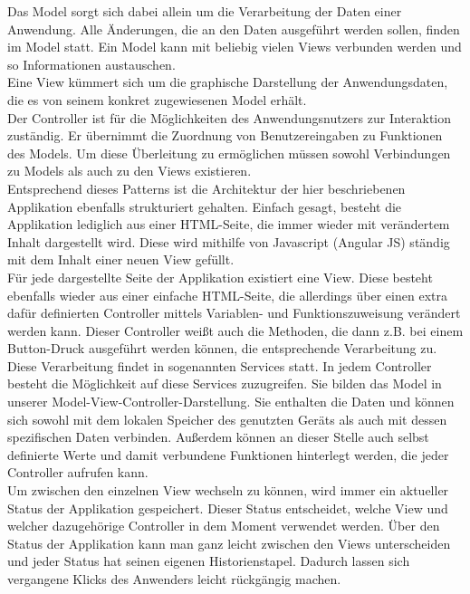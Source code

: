 Das Model sorgt sich dabei allein um die Verarbeitung der Daten einer Anwendung. Alle Änderungen, die an den Daten ausgeführt werden sollen, finden im Model statt. Ein Model kann mit beliebig vielen Views verbunden werden und so Informationen austauschen. 
\\
Eine View kümmert sich um die graphische Darstellung der Anwendungsdaten, die es von seinem konkret zugewiesenen Model erhält. 
\\
Der Controller ist für die Möglichkeiten des Anwendungsnutzers zur Interaktion zuständig. Er übernimmt die Zuordnung von Benutzereingaben zu Funktionen des Models. Um diese Überleitung zu ermöglichen müssen sowohl Verbindungen zu Models als auch zu den Views existieren.
\\
Entsprechend dieses Patterns ist die Architektur der hier beschriebenen Applikation ebenfalls strukturiert gehalten. Einfach gesagt, besteht die Applikation lediglich aus einer HTML-Seite, die immer wieder mit verändertem Inhalt dargestellt wird. Diese wird mithilfe von Javascript (Angular JS) ständig mit dem Inhalt einer neuen View gefüllt.
\\
Für jede dargestellte Seite der Applikation existiert eine View. Diese besteht ebenfalls wieder aus einer einfache HTML-Seite, die allerdings über einen extra dafür definierten Controller mittels Variablen- und Funktionszuweisung verändert werden kann. Dieser Controller weißt auch die Methoden, die dann z.B. bei einem Button-Druck ausgeführt werden können, die entsprechende Verarbeitung zu.
\\
Diese Verarbeitung findet in sogenannten Services statt. In jedem Controller besteht die Möglichkeit auf diese Services zuzugreifen. Sie bilden das Model in unserer Model-View-Controller-Darstellung. Sie enthalten die Daten und können sich sowohl mit dem lokalen Speicher des genutzten Geräts als auch mit dessen spezifischen Daten verbinden. Außerdem können an dieser Stelle auch selbst definierte Werte und damit verbundene Funktionen hinterlegt werden, die jeder Controller aufrufen kann.
\\
Um zwischen den einzelnen View wechseln zu können, wird immer ein aktueller Status der Applikation gespeichert. Dieser Status entscheidet, welche View und welcher dazugehörige Controller in dem Moment verwendet werden. Über den Status der Applikation kann man ganz leicht zwischen den Views unterscheiden und jeder Status hat seinen eigenen Historienstapel. Dadurch lassen sich vergangene Klicks des Anwenders leicht rückgängig machen.
\\
